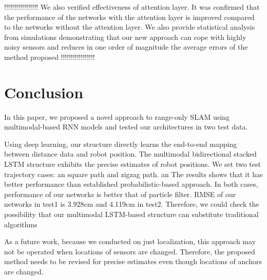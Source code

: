 \documentclass[letterpaper, 10 pt, conference]{ieeeconf}  %
\begin{document}
!!!!!!!!!!!!!!!!!
We also verified effectiveness of attention layer. It was confirmed that the performance of the networks with the attention layer is improved compared to the networks without the attention layer.
We also provide statistical analysis from simulations demonstrating that
our new approach can cope with highly noisy sensors and
reduces in one order of magnitude the average errors of the
method proposed
!!!!!!!!!!!!!!!!!


\section{Conclusion}

In this paper, we proposed a novel approach to range-only SLAM using multimodal-based RNN models and tested our architectures in two test data.

Using deep learning, our structure directly learns the end-to-end mapping between distance data and robot position. The multimodal bidirectional stacked LSTM structure exhibits the precise estimates of robot positions. We set two test trajectory cases: an square path and zigzag path. an The results shows that it has better performance than established probabilistic-based approach. In both cases, performance of our networks  is better that of particle filter. RMSE of our networks in test1 is 3.928cm and 4.119cm in test2. Therefore, we could check the possibility that our multimodal LSTM-based structure can substitute traditional algorithms

As a future work, because we conducted on just localization, this approach may not be operated when locations of sensors are changed. Therefore, the proposed method needs to be revised for precise estimates even though locations of anchors are changed. 


\end{document}
